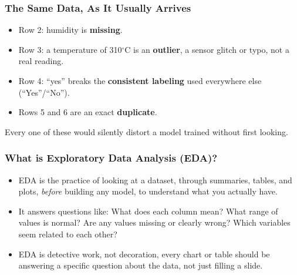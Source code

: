 \begin{frame}[fragile]\frametitle{The Same Data, As It Usually Arrives}
\begin{center}
\end{center}
\begin{itemize}
\item Row 2: humidity is \textbf{missing}.
\item Row 3: a temperature of 310$^\circ$C is an \textbf{outlier}, a sensor glitch or typo,
  not a real reading.
\item Row 4: ``yes'' breaks the \textbf{consistent labeling} used everywhere else
  (``Yes''/``No'').
\item Rows 5 and 6 are an exact \textbf{duplicate}.
\end{itemize}
Every one of these would silently distort a model trained without first looking.
\end{frame}

\begin{frame}[fragile]\frametitle{What is Exploratory Data Analysis (EDA)?}
\begin{itemize}
\item EDA is the practice of looking at a dataset, through summaries, tables, and plots,
  \emph{before} building any model, to understand what you actually have.
\item It answers questions like: What does each column mean? What range of values is normal?
  Are any values missing or clearly wrong? Which variables seem related to each other?
\item EDA is detective work, not decoration, every chart or table should be answering a
  specific question about the data, not just filling a slide.
\end{itemize}
\end{frame}

